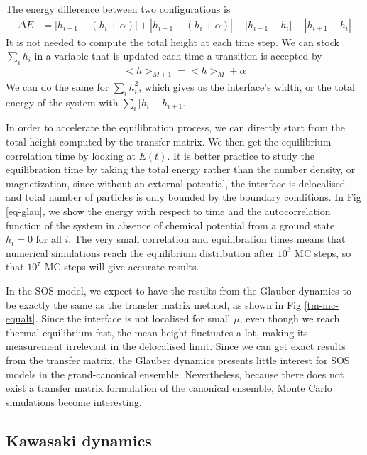 The energy difference between two configurations is
\begin{align}
	\Delta E &= |h_{i-1}-(h_i + \alpha)| + |h_{i+1}-(h_i + \alpha)| - |h_{i-1}-h_i| - |h_{i+1}-h_i|  
\end{align}
It is not needed to compute the total height at each time step. We can stock $\sum_i h_i$ in a variable that is updated each time a transition is accepted by
\begin{align}
    <h>_{M+1} = <h>_M + \alpha
\end{align}
We can do the same for $\sum_i h_i^2$, which gives us the interface's width, or the total energy of the system with $\sum_i |h_i - h_{i+1}$.

In order to accelerate the equilibration process, we can directly start from the total height computed by the transfer matrix. We then get the equilibrium correlation time by looking at $E(t)$. It is better practice to study the equilibration time by taking the total energy rather than the number density, or magnetization, since without an external potential, the interface is delocalised and total number of particles is only bounded by the boundary conditions. In Fig \ref{eq-glau}, we show the energy with respect to time and the autocorrelation function of the system in absence of chemical potential from a ground state $h_i=0$ for all $i$. The very small correlation and equilibration times means that numerical simulations reach the equilibrium distribution after $10^3$ MC steps, so that $10^7$ MC steps will give accurate results.

In the SOS model, we expect to have the results from the Glauber dynamics to be exactly the same as the transfer matrix method, as shown in Fig \ref{tm-mc-equalt}. Since the interface is not localised for small $\mu$, even though we reach thermal equilibrium fast, the mean height  fluctuates a lot, making its measurement irrelevant in the delocalised limit. Since we can get exact results from the transfer matrix, the Glauber dynamics presents little interest for SOS models in the grand-canonical ensemble. Nevertheless, because there does not exist a transfer matrix formulation of the canonical ensemble, Monte Carlo simulations become interesting.

\subsection{Kawasaki dynamics}
\label{algo-kawasaki}


